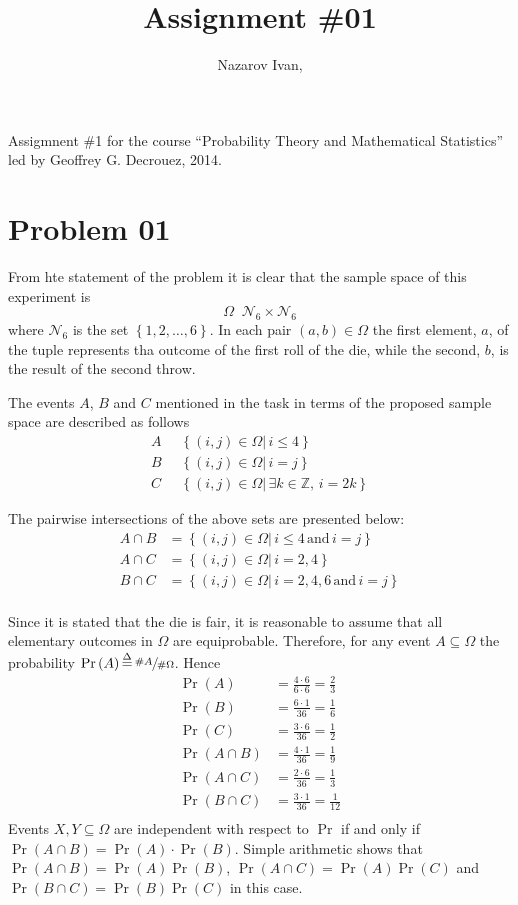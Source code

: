 \documentclass[a4paper]{article}
\title{Assignment \#01}
\author{Nazarov Ivan, \rus{101мНОД(ИССА)}}
\newcommand{\obj}[1]{\left\{ #1 \right \}}
\newcommand{\brac}[1]{\left ( #1 \right )}
\newcommand{\induc}[1]{\left . #1 \right \vert}
\newcommand{\Ncal}{\mathcal{N}}
\newcommand{\defn}{\mathop{\overset{\Delta}{=}}\nolimits}
\begin{document}
\maketitle
\noindent Assigmnent \#1 for the course ``Probability Theory and Mathematical Statistics'' led by Geoffrey G. Decrouez, 2014.

\section{Problem 01} %
\label{sec:problem_01}

From hte statement of the problem it is clear that the sample space of this experiment is \[\Omega \defn \Ncal_6\times \Ncal_6\] where $\Ncal_6$ is the set $\obj{1,2,\ldots, 6}$. In each pair $\brac{a,b}\in \Omega$ the first element, $a$, of the tuple represents tha outcome of the first roll of the die, while the second, $b$, is the result of the second throw.

The events $A$, $B$ and $C$ mentioned in the task in terms of the proposed sample space are described as follows \begin{align*}
A&\defn \obj{\induc{\brac{i,j}\in\Omega}\,i\leq 4}\\
B&\defn \obj{\induc{\brac{i,j}\in\Omega}\,i = j}\\
C&\defn \obj{\induc{\brac{i,j}\in\Omega}\,\exists k\in \mathbb{Z},\, i = 2k}\end{align*}

The pairwise intersections of the above sets are presented below:\begin{align*}
	A\cap B & = \obj{\induc{\brac{i,j}\in\Omega}\,i\leq 4\,\text{and}\,i=j}\\
	A\cap C & = \obj{\induc{\brac{i,j}\in\Omega}\,i = 2, 4}\\
	B\cap C & = \obj{\induc{\brac{i,j}\in\Omega}\,i = 2,4,6\,\text{and}\,i=j}\\
\end{align*}

Since it is stated that the die is fair, it is reasonable to assume that all elementary outcomes in $\Omega$ are equiprobable. Therefore, for any event $A\subseteq \Omega$ the probability $\Pr\brac{A}\defn \sfrac{\#A}{\#\Omega}$. Hence\begin{align*}
\Pr\brac{A} &= \frac{4\cdot 6}{6\cdot 6} = \frac{2}{3}\\
\Pr\brac{B} &= \frac{6\cdot 1}{36} = \frac{1}{6}\\
\Pr\brac{C} &= \frac{3\cdot 6}{36} = \frac{1}{2}\\
\Pr\brac{A\cap B} &= \frac{4\cdot 1}{36} = \frac{1}{9}\\
\Pr\brac{A\cap C} &= \frac{2\cdot 6}{36} = \frac{1}{3}\\
\Pr\brac{B\cap C} &= \frac{3\cdot 1}{36} = \frac{1}{12}\\
\end{align*} Events $X,Y\subseteq \Omega$ are independent with respect to $\Pr$ if and only if $\Pr\brac{A\cap B} = \Pr\brac{A}\cdot \Pr\brac{B}$. Simple arithmetic shows that $\Pr\brac{A\cap B} = \Pr\brac{A}\Pr\brac{B}$, $\Pr\brac{A\cap C} = \Pr\brac{A}\Pr\brac{C}$ and $\Pr\brac{B\cap C} = \Pr\brac{B}\Pr\brac{C}$ in this case.
\end{document}
